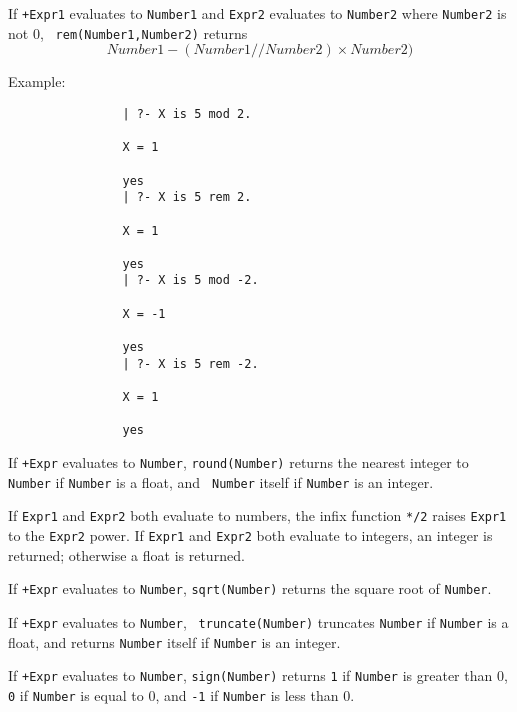 \begin{description}
If {\tt +Expr1} evaluates to {\tt Number1} and {\tt Expr2} evaluates
to {\tt Number2} where {\tt Number2} is not 0, {\tt
rem(Number1,Number2)} returns
\[
	Number1 - ({Number1} // {Number2}) \times Number2)
\]

    Example:
    {\footnotesize
     \begin{verbatim}
                | ?- X is 5 mod 2.

                X = 1

                yes
                | ?- X is 5 rem 2.

                X = 1

                yes
                | ?- X is 5 mod -2.

                X = -1

                yes
                | ?- X is 5 rem -2.

                X = 1

                yes
  \end{verbatim}}

 If
{\tt +Expr} evaluates to {\tt Number}, {\tt round(Number)} returns the
nearest integer to {\tt Number} if {\tt Number} is a float, and {\tt
Number} itself if {\tt Number} is an integer.

  
%
If {\tt Expr1} and {\tt Expr2} both evaluate to numbers, the infix
function {\tt **/2} raises {\tt Expr1} to the {\tt Expr2} power.  If
{\tt Expr1} and {\tt Expr2} both evaluate to integers, an integer is
returned; otherwise a float is returned.

If {\tt +Expr} evaluates to {\tt Number}, {\tt sqrt(Number)}
returns the square root of {\tt Number}.

 If {\tt +Expr} evaluates to {\tt Number}, {\tt
truncate(Number)} truncates {\tt Number} if {\tt Number} is a float,
and returns {\tt Number} itself if {\tt Number} is an integer.

%
If {\tt +Expr} evaluates to {\tt Number}, {\tt sign(Number)} returns
{\tt 1} if {\tt Number} is greater than 0, {\tt 0} if {\tt Number} is
equal to 0, and {\tt -1} if {\tt Number} is less than 0.

\end{description}

